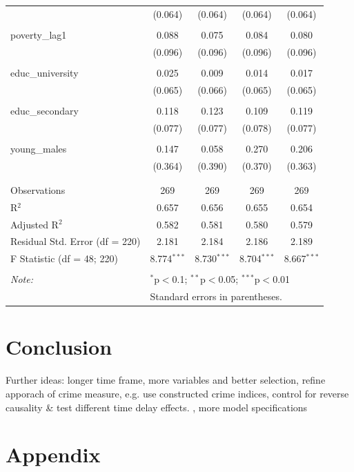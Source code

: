 \documentclass[a4paper,12pt]{article}
\begin{document}
{\begin{table}[!htbp]
\begin{tabular}{@{\extracolsep{5pt}}lcccc}
  & (0.064) & (0.064) & (0.064) & (0.064) \\ 
  & & & & \\ 
 poverty\_lag1 & 0.088 & 0.075 & 0.084 & 0.080 \\ 
  & (0.096) & (0.096) & (0.096) & (0.096) \\ 
  & & & & \\ 
 educ\_university & 0.025 & 0.009 & 0.014 & 0.017 \\ 
  & (0.065) & (0.066) & (0.065) & (0.065) \\ 
  & & & & \\ 
 educ\_secondary & 0.118 & 0.123 & 0.109 & 0.119 \\ 
  & (0.077) & (0.077) & (0.078) & (0.077) \\ 
  & & & & \\ 
 young\_males & 0.147 & 0.058 & 0.270 & 0.206 \\ 
  & (0.364) & (0.390) & (0.370) & (0.363) \\ 
  & & & & \\ 
\hline \\[-1.8ex] 
Observations & 269 & 269 & 269 & 269 \\ 
R$^{2}$ & 0.657 & 0.656 & 0.655 & 0.654 \\ 
Adjusted R$^{2}$ & 0.582 & 0.581 & 0.580 & 0.579 \\ 
Residual Std. Error (df = 220) & 2.181 & 2.184 & 2.186 & 2.189 \\ 
F Statistic (df = 48; 220) & 8.774$^{***}$ & 8.730$^{***}$ & 8.704$^{***}$ & 8.667$^{***}$ \\ 
\hline 
\hline \\[-1.8ex] 
\textit{Note:}  & \multicolumn{4}{l}{$^{*}$p$<$0.1; $^{**}$p$<$0.05; $^{***}$p$<$0.01} \\ 
 & \multicolumn{4}{l}{Standard errors in parentheses.} \\ 
\end{tabular} 
\end{table} 
}
\section{Conclusion}
\label{Conclusion}


Further ideas: longer time frame, more variables and better selection, refine apporach of crime measure, e.g. use constructed crime indices, control for reverse causality \& test different time delay effects. , more model specifications
\clearpage


   

\newpage

\section*{Appendix}
\end{document}
